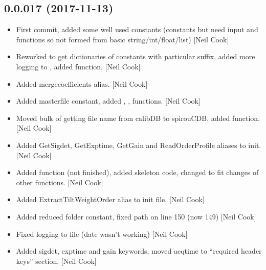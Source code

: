 \documentclass[a4paper,10pt,english]{report}
\begin{document}
\subsection{0.0.017 (2017-11-13)}
\label{\detokenize{misc/changelog:id533}}\begin{itemize}
\item {} 
First commit, added some well used constants (constants but need input
and functions so not formed from basic string/int/float/list) {[}Neil
Cook{]}

\item {} 
Reworked  to get dictionaries of constants with particular
suffix, added more logging to , added
 function. {[}Neil Cook{]}

\item {} 
Added mergecoefficients alias. {[}Neil Cook{]}

\item {} 
Added masterfile constant, added , , 
functions. {[}Neil Cook{]}

\item {} 
Moved bulk of getting file name from calibDB to spirouCDB, added
 function. {[}Neil Cook{]}

\item {} 
Added GetSigdet, GetExptime, GetGain and ReadOrderProfile aliases to
init. {[}Neil Cook{]}

\item {} 
Added  function (not finished), added
 skeleton code, changed  to fit
changes of other functions. {[}Neil Cook{]}

\item {} 
Added ExtractTiltWeightOrder alias to init file. {[}Neil Cook{]}

\item {} 
Added reduced folder constant, fixed  path on line 150 (now
149) {[}Neil Cook{]}

\item {} 
Fixed logging to file (date wasn’t working) {[}Neil Cook{]}

\item {} 
Added sigdet, exptime and gain keywords, moved acqtime to “required
header keys” section. {[}Neil Cook{]}


\end{itemize}
\end{document}
